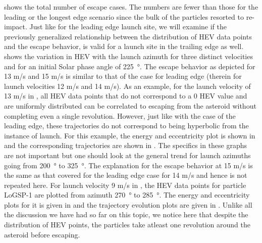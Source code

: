 \FloatBarrier
 shows the total number of escape cases. The numbers are fewer than those for the leading or the longest edge scenario since the bulk of the particles resorted to re-impact. Just like for the leading edge launch site, we will examine if the previously generalized relationship between the distribution of \gls{HEV} data points and the escape behavior, is valid for a launch site in the trailing edge as well.  shows the variation in \gls{HEV} with the launch azimuth for three distinct velocities and for an initial Solar phase angle of \SI{225}{\degree}. The escape behavior as depicted for 13 m/s and 15 m/s is similar to that of the case for leading edge (therein for launch velocities 12 m/s and 14 m/s). As an example, for the launch velocity of 13 m/s in , all \gls{HEV} data points that do not correspond to a 0 \gls{HEV} value and are uniformly distributed can be correlated to escaping from the asteroid without completing even a single revolution. However, just like with the case of the leading edge, these trajectories do not correspond to being hyperbolic from the instance of launch. For this example, the energy and eccentricity plot is shown in  and the corresponding trajectories are shown in . The specifics in these graphs are not important but one should look at the general trend for launch azimuths going from \SI{200}{\degree} to \SI{325}{\degree}. The explanation for the escape behavior at 15 m/s is the same as that covered for the leading edge case for 14 m/s and hence is not repeated here. For launch velocity 9 m/s in , the \gls{HEV} data points for particle LoGSP-1 are plotted from azimuth \SI{270}{\degree} to \SI{285}{\degree}. The energy and eccentricity plots for it is given in  and the trajectory evolution plots are given in . Unlike all the discussion we have had so far on this topic, we notice here that despite the distribution of \gls{HEV} points, the particles take atleast one revolution around the asteroid before escaping.
